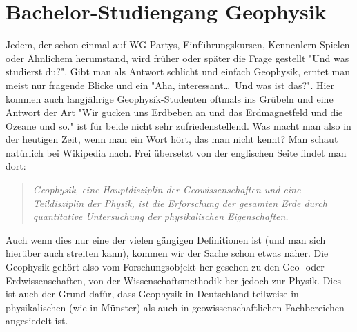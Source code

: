 \section{Bachelor-Studiengang Geophysik}
\begin{multicols}{2}
Jedem, der schon einmal auf WG-Partys, Einführungskursen, Kennenlern-Spielen oder Ähnlichem herumstand, wird früher oder später die Frage gestellt "Und was studierst du?".
Gibt man als Antwort schlicht und einfach Geophysik, erntet man meist nur fragende Blicke und ein "Aha, interessant\dots\ Und was ist das?".
Hier kommen auch langjährige Geophysik-Studenten oftmals ins Grübeln und eine Antwort der Art "Wir gucken uns Erdbeben an und das Erdmagnetfeld und die Ozeane und so." ist für beide nicht sehr zufriedenstellend.
Was macht man also in der heutigen Zeit, wenn man ein Wort hört, das man nicht kennt? Man schaut natürlich bei Wikipedia nach.
Frei übersetzt von der englischen Seite findet man dort:
\vspace*{-0.5cm}
\begin{quote}
	\textit{Geophysik, eine Hauptdisziplin der Geowissenschaften und eine Teildisziplin der Physik, ist die Erforschung der gesamten Erde durch quantitative Untersuchung der physikalischen Eigenschaften.}
\end{quote}

Auch wenn dies nur eine der vielen gängigen Definitionen ist (und man sich hierüber auch streiten kann), kommen wir der Sache schon etwas näher.
Die Geophysik gehört also vom Forschungsobjekt her gesehen zu den Geo- oder Erdwissenschaften, von der Wissenschaftsmethodik her jedoch zur Physik.
Dies ist auch der Grund dafür, dass Geophysik in Deutschland teilweise in physikalischen (wie in Münster) als auch in geowissenschaftlichen Fachbereichen angesiedelt ist.

{}


\end{multicols}

